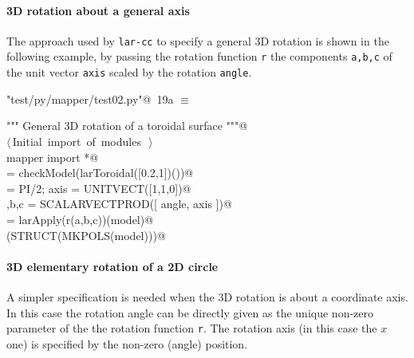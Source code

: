 \documentclass[11pt,oneside]{article}	%
\begin{document}
\paragraph{3D rotation about a general axis}
The approach used by \texttt{lar-cc} to specify a general 3D rotation is shown in the following example,
by passing the rotation function \texttt{r} the components \texttt{a,b,c} of the unit vector \texttt{axis} scaled by the rotation \texttt{angle}. 

\begin{flushleft} \small \label{scrap35}
\protect{}\verb@"test/py/mapper/test02.py"@\nobreak\ {\footnotesize 19a }$\equiv$
\vspace{-1ex}
\begin{list}{}{} \item
\mbox{}\verb@""" General 3D rotation of a toroidal surface """@\\
\mbox{}\verb@@\hbox{$\langle\,$Initial import of modules\nobreak\ {\footnotesize {}}$\,\rangle$}\verb@@\\
\mbox{}\verb@from mapper import *@\\
\mbox{}\verb@model = checkModel(larToroidal([0.2,1])())@\\
\mbox{}\verb@angle = PI/2; axis = UNITVECT([1,1,0])@\\
\mbox{}\verb@a,b,c = SCALARVECTPROD([ angle, axis ])@\\
\mbox{}\verb@model = larApply(r(a,b,c))(model)@\\
\mbox{}\verb@VIEW(STRUCT(MKPOLS(model)))@\\
\mbox{}\verb@@{\NWsep}
\end{list}
\vspace{-2ex}
\end{flushleft}


\paragraph{3D elementary rotation of a 2D circle}
A simpler specification is needed when the 3D rotation is about a coordinate axis. In this case the rotation angle can be directly given as the unique non-zero parameter of the the rotation function \texttt{r}. The rotation axis (in this case the $x$ one) is specified by the non-zero (angle) position.
\end{document}
